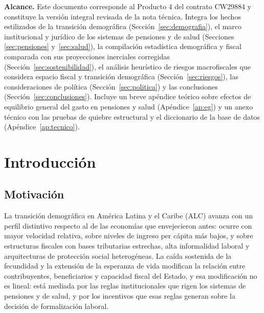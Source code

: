 \documentclass[12pt, letterpaper]{article}
\begin{document}
\vspace{0.5cm}

\begin{small}
\noindent\textbf{Alcance.} Este documento corresponde al Producto 4 del contrato
CW29884 y constituye la versión integral revisada de la nota técnica. Integra los
hechos estilizados de la transición demográfica (Sección~\ref{sec:demografia}), el
marco institucional y jurídico de los sistemas de pensiones y de salud (Secciones
\ref{sec:pensiones} y~\ref{sec:salud}), la compilación estadística demográfica y
fiscal comparada con sus proyecciones inerciales corregidas
(Sección~\ref{sec:sostenibilidad}), el análisis heurístico de riesgos macrofiscales
que considera espacio fiscal y transición demográfica (Sección~\ref{sec:riesgos}),
las consideraciones de política (Sección~\ref{sec:politica}) y las conclusiones
(Sección~\ref{sec:conclusiones}). Incluye un breve apéndice teórico sobre efectos de
equilibrio general del gasto en pensiones y salud (Apéndice~\ref{ap:eg}) y un anexo
técnico con las pruebas de quiebre estructural y el diccionario de la base de datos
(Apéndice~\ref{ap:tecnico}).
\end{small}

\newpage

\tableofcontents
\newpage

\section{Introducción}

\subsection{Motivación}

La transición demográfica en América Latina y el Caribe (ALC) avanza con un perfil
distintivo respecto al de las economías que envejecieron antes: ocurre con mayor
velocidad relativa, sobre niveles de ingreso per cápita más bajos, y sobre estructuras
fiscales con bases tributarias estrechas, alta informalidad laboral y arquitecturas
de protección social heterogéneas. La caída sostenida de la fecundidad y la
extensión de la esperanza de vida modifican la relación entre contribuyentes,
beneficiarios y capacidad fiscal del Estado, y esa modificación no es lineal: está
mediada por las reglas institucionales que rigen los sistemas de pensiones y de
salud, y por los incentivos que esas reglas generan sobre la decisión de
formalización laboral.
\end{document}
